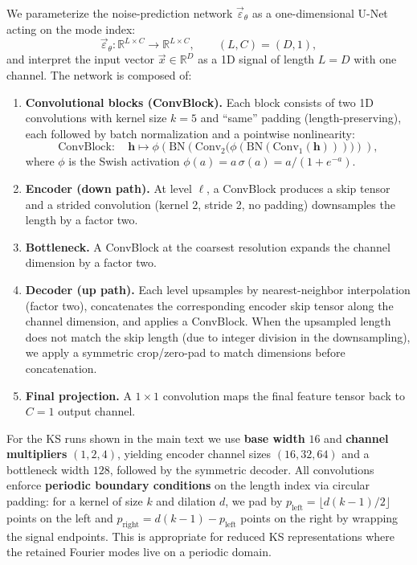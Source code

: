 \documentclass[%
  prl,
  reprint,
  amsmath,
  amssymb,
  aps
]{revtex4-2}
\newcommand{\vvec}[1]{\vec{#1}}
\begin{document}
We parameterize the noise-prediction network $\vvec{\varepsilon}_{\theta}$ as a one-dimensional U-Net acting on the mode index:
\begin{equation}
\vvec{\varepsilon}_{\theta}:\mathbb{R}^{L\times C}\to\mathbb{R}^{L\times C},
\qquad (L,C)=(D,1),
\end{equation}
and interpret the input vector $\vvec{x}\in\mathbb{R}^{D}$ as a 1D signal of length $L=D$ with one channel. The network is composed of:
\begin{enumerate}
    \item \textbf{Convolutional blocks (ConvBlock).} Each block consists of two 1D convolutions with kernel size $k=5$ and ``same'' padding (length-preserving), each followed by batch normalization and a pointwise nonlinearity:
    \begin{equation}
    \text{ConvBlock}:\quad
    \bm{h}\mapsto \phi\!\left(\mathrm{BN}\!\left(\mathrm{Conv}_2\bigl(\phi(\mathrm{BN}(\mathrm{Conv}_1(\bm{h})))\bigr)\right)\right),
    \end{equation}
    where $\phi$ is the Swish activation $\phi(a)=a\,\sigma(a)=a/(1+e^{-a})$.
    \item \textbf{Encoder (down path).} At level $\ell$, a ConvBlock produces a skip tensor and a strided convolution (kernel 2, stride 2, no padding) downsamples the length by a factor two.
    \item \textbf{Bottleneck.} A ConvBlock at the coarsest resolution expands the channel dimension by a factor two.
    \item \textbf{Decoder (up path).} Each level upsamples by nearest-neighbor interpolation (factor two), concatenates the corresponding encoder skip tensor along the channel dimension, and applies a ConvBlock. When the upsampled length does not match the skip length (due to integer division in the downsampling), we apply a symmetric crop/zero-pad to match dimensions before concatenation.
    \item \textbf{Final projection.} A $1\times1$ convolution maps the final feature tensor back to $C=1$ output channel.
\end{enumerate}

For the KS runs shown in the main text we use \textbf{base width} $16$ and \textbf{channel multipliers} $(1,2,4)$, yielding encoder channel sizes $(16,32,64)$ and a bottleneck width $128$, followed by the symmetric decoder. All convolutions enforce \textbf{periodic boundary conditions} on the length index via circular padding: for a kernel of size $k$ and dilation $d$, we pad by $p_{\mathrm{left}}=\lfloor d(k-1)/2\rfloor$ points on the left and $p_{\mathrm{right}}=d(k-1)-p_{\mathrm{left}}$ points on the right by wrapping the signal endpoints. This is appropriate for reduced KS representations where the retained Fourier modes live on a periodic domain.
\end{document}
